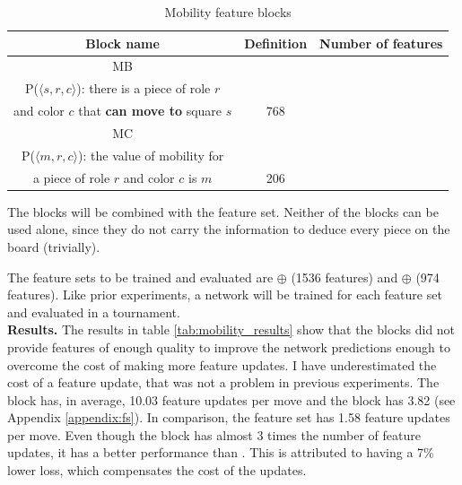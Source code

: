 \begin{table}[H]
\caption{Mobility feature blocks}
\label{tab:mobility_blocks}
\centering

\begin{tabular}{ccc}
\toprule
\bf Block name & \bf Definition & \bf Number of features \\
\toprule
MB & \makecell{
\vspace{0.2cm}
($\featureset{Squares} \times \featureset{Roles} \times \featureset{Colors})_P$ \\
P($\langle s, r, c \rangle$): there is a piece of role $r$\\ and color $c$ that \textbf{can move to} square $s$
} & 768 \\
\toprule
MC & \makecell{
\vspace{0.2cm}
$(\{0, 1, \hdots\} \times \featureset{Roles} \times \featureset{Colors})_{P}$\\
P($\langle m, r, c \rangle$): the value of mobility for\\
a piece of role $r$ and color $c$ is $m$
} & 206 \\
\bottomrule
\end{tabular}
\end{table}

The blocks will be combined with the  feature set. Neither of the blocks can be used alone, since they do not carry the information to deduce every piece on the board (trivially).

The feature sets to be trained and evaluated are  $\oplus$  (1536 features) and  $\oplus$  (974 features). Like prior experiments, a network will be trained for each feature set and evaluated in a tournament. \\

\textbf{Results.} The results in table \ref{tab:mobility_results} show that the blocks did not provide features of enough quality to improve the network predictions enough to overcome the cost of making more feature updates. I have underestimated the cost of a feature update, that was not a problem in previous experiments. The block  has, in average, 10.03 feature updates per move and the block  has 3.82 (see Appendix \ref{appendix:fs}). In comparison, the  feature set has 1.58 feature updates per move. Even though the block  has almost 3 times the number of feature updates, it has a better performance than . This is attributed to having a 7\% lower loss, which compensates the cost of the updates. \\

